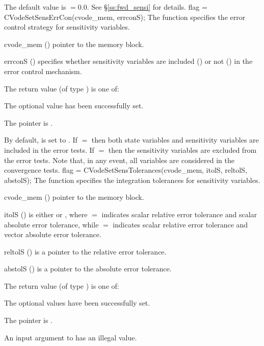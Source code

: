 {
  The default value is $=0.0$. See \S\ref{ss:fwd_sensi} for
  details.
}
{
  flag = CVodeSetSensErrCon(cvode\_mem, errconS);
}
{
  The function  specifies the error control
  strategy for sensitivity variables.
}
{
  \begin{args}
  \item[cvode\_mem] ()
    pointer to the {\cvodes} memory block.
  \item[errconS] ()
    specifies whether sensitivity variables are included () or not
    () in the error control mechanism.
  \end{args}
}
{
  The return value  (of type ) is one of:
  \begin{args}
  \item[\Id{CV\_SUCCESS}] 
    The optional value has been successfully set.
  \item[\Id{CV\_MEM\_NULL}]
    The  pointer is .
  \end{args}
}
{
  By default,  is set to . 
  If $=$ then both state variables and
  sensitivity variables are included in the error tests. 
  If $=$ then the sensitivity variables are excluded from the 
  error tests. Note that, in any event, all variables are considered in the convergence 
  tests.
}
{
  flag = CVodeSetSensTolerances(cvode\_mem, itolS, reltolS, abstolS);
}
{
  The function  specifies the integration tolerances for
  sensitivity variables.
}
{
  \begin{args}
  \item[cvode\_mem] ()
    pointer to the {\cvodes} memory block.
  \item[itolS]  () 
    is either  or , where $=$ indicates scalar relative error 
    tolerance and scalar absolute error tolerance, while $=$ indicates scalar
    relative error tolerance and vector absolute error tolerance. 
  \item[reltolS] ()
    is a pointer to the relative error tolerance.
  \item[abstolS] ()
    is a pointer to the absolute error tolerance.
  \end{args}
}
{
  The return value  (of type ) is one of:
  \begin{args}
  \item[\Id{CV\_SUCCESS}] 
    The optional values have been successfully set.
  \item[\Id{CV\_MEM\_NULL}]
    The  pointer is .
  \item[\Id{CV\_ILL\_INPUT}]
     An input argument to  has an illegal value.
  \end{args}
}
